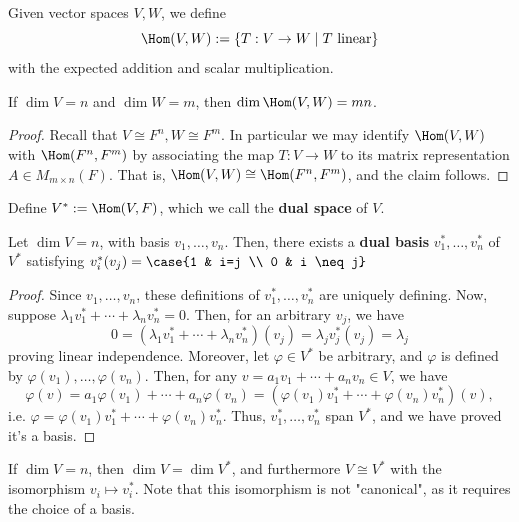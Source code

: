 \begin{defn}
    Given vector spaces $V,W$, we define
    $$\Hom(V,W) := \{T:V \to W \mid T\text{ linear}\}$$
    with the expected addition and scalar multiplication.
\end{defn}

\begin{prop}
    If $\dim V = n$ and $\dim W = m$, then $\dim \Hom (V,W)=mn$.
\end{prop}

\begin{proof}
    Recall that $V \cong  F^n,W \cong F^m$.  In particular we may identify $\Hom(V,W)$ with $\Hom(F^n,F^m)$ by associating the map $T:V \to W$ to its matrix representation $A \in M_{m \times n}(F)$. That is, $\Hom(V,W) \cong \Hom(F^n,F^m)$, and the claim follows.
\end{proof}

\begin{defn}
    Define $V^*:=\Hom(V,F)$, which we call the \textbf{dual space} of $V$.
\end{defn}

\begin{thm}
    Let $\dim V= n$, with basis $v_1,\dots,v_n$. Then, there exists a \textbf{dual basis} $v_1^*,\dots,v_n^*$ of $V^*$ satisfying $v_i^{*}(v_j) =\case{1 & i=j \\ 0 & i \neq j}$
\end{thm}

\begin{proof}
    Since $v_1,\dots,v_n$, these definitions of $v_1^*,\dots,v_n^*$ are uniquely defining. Now, suppose $\lambda_1v_1^*+\cdots +\lambda_nv_n^*=0$. Then, for an arbitrary $v_j$, we have
    $$0 = (\lambda_1v_1^*+\cdots + \lambda_nv_n^*)(v_j)=\lambda_jv_j^*(v_j)=\lambda_j$$
    proving linear independence. Moreover, let $\varphi \in V^*$ be arbitrary, and $\varphi$ is defined by $\varphi(v_1),\dots,\varphi(v_n)$. Then, for any $v = a_1v_1+\cdots +a_nv_n \in V$, we have
    $$\varphi(v)=a_1\varphi(v_1)+\cdots +a_n\varphi(v_n)=(\varphi(v_1)v_1^*+\cdots +\varphi(v_n)v_n^*)(v),$$
    i.e. $\varphi =\varphi(v_1)v_1^*+\cdots +\varphi(v_n)v_n^*$. Thus, $v_1^*,\dots,v_n^*$ span $V^*$, and we have proved it's a basis.
\end{proof}

\begin{cor}
    If $\dim V=n$, then $\dim V= \dim V^*$, and furthermore $V \cong V^*$ with the isomorphism $v_i \mapsto v_i^*$. Note that this isomorphism is not "canonical", as it requires the choice of a basis.
\end{cor}

